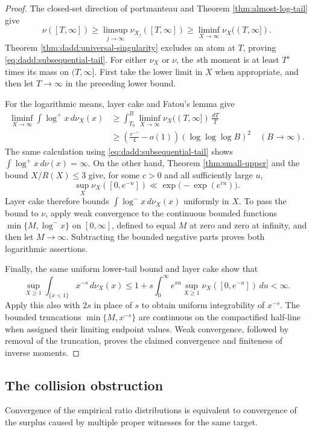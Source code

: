 \documentclass[11pt,letterpaper,reqno]{amsart}
\numberwithin{equation}{section}
\theoremstyle{remark}
\newcommand{\1}{\mathbf 1}
\renewcommand{\leq}{\leqslant}
\renewcommand{\geq}{\geqslant}
\begin{document}
\begin{proof}
The closed-set direction of portmanteau and
Theorem \ref{thm:almost-log-tail} give
\[
 \nu([T,\infty])
 \geq\limsup_{j\to\infty}\nu_{X_j}([T,\infty])
 \geq\liminf_{X\to\infty}\nu_X((T,\infty]).
\]
Theorem \ref{thm:dadd:universal-singularity} excludes an atom at
$T$, proving \eqref{eq:dadd:subsequential-tail}. For either $\nu_X$
or $\nu$, the $s$th moment is at least $T^s$ times its mass on
$(T,\infty]$. First take the lower limit in $X$ when appropriate,
and then let $T\to\infty$ in the preceding lower bound.

For the logarithmic means, layer cake and Fatou's lemma give
\begin{align*}
 \liminf_{X\to\infty}\int\log^+x\,d\nu_X(x)
 &\geq\int_{T_0}^B
 \liminf_{X\to\infty}\nu_X((T,\infty])\,\frac{dT}{T}\\
 &\geq\left(\frac{e^{-\gamma}}4-o(1)\right)
 (\log\log\log B)^2
 \quad(B\to\infty).
\end{align*}
The same calculation using \eqref{eq:dadd:subsequential-tail}
shows $\int\log^+x\,d\nu(x)=\infty$. On the other hand,
Theorem \ref{thm:small-upper} and the bound $X/R(X)\leq3$ give,
for some $c>0$ and all sufficiently large $u$,
\[
 \sup_X\nu_X([0,e^{-u}])
 \ll\exp\bigl(-\exp(e^{cu})\bigr).
\]
Layer cake therefore bounds $\int\log^-x\,d\nu_X(x)$ uniformly
in $X$. To pass the bound to $\nu$, apply weak convergence to the
continuous bounded functions $\min\{M,\log^-x\}$ on $[0,\infty]$,
defined to equal $M$ at zero and zero at infinity, and then let
$M\to\infty$.
Subtracting the bounded negative parts proves both logarithmic
assertions.

Finally, the same uniform lower-tail bound and layer cake show that
\[
 \sup_{X\geq1}\int_{\{x<1\}}x^{-s}\,d\nu_X(x)
 \leq 1+s\int_0^\infty e^{su}
 \sup_{X\geq1}\nu_X([0,e^{-u}])\,du<\infty.
\]
Apply this also with $2s$ in place of $s$ to obtain uniform integrability
of $x^{-s}$. The bounded truncations $\min\{M,x^{-s}\}$ are continuous
on the compactified half-line when assigned their limiting endpoint
values. Weak convergence, followed by removal of the truncation, proves
the claimed convergence and finiteness of inverse moments.
\end{proof}

\subsection{The collision obstruction}

Convergence of the empirical ratio distributions is equivalent to convergence of the surplus caused by multiple proper witnesses for the same target.
\end{document}
